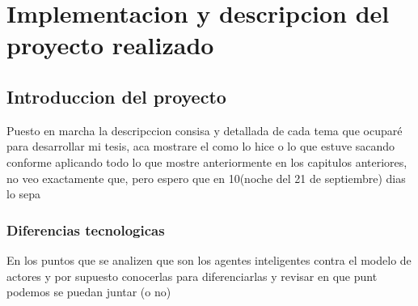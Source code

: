 
\chapter{Implementacion y descripcion del proyecto realizado} %
\label{Chapter4}


\section{Introduccion del proyecto}

Puesto en marcha la descripccion consisa y detallada de cada tema que
ocupar\'e para desarrollar mi tesis, aca mostrare el como lo hice o lo
que estuve sacando conforme aplicando todo lo que mostre anteriormente
en los capitulos anteriores, no veo exactamente que, pero espero que
en 10(noche del 21 de septiembre) dias lo sepa

\subsection{Diferencias tecnologicas}
\label{sec:tech}

En los puntos que se analizen que son los agentes inteligentes contra
el modelo de actores y por supuesto conocerlas para diferenciarlas y
revisar en que punt podemos se puedan juntar (o no)


